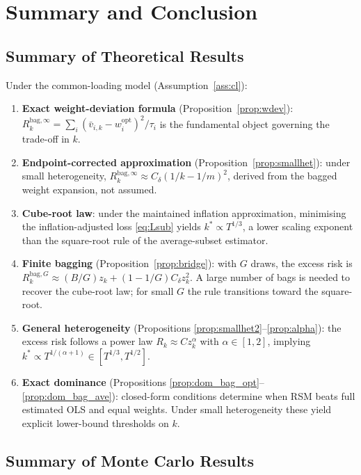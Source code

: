 \documentclass[12pt,a4paper]{article}
\theoremstyle{definition}
\begin{document}
\section{Summary and Conclusion}

\subsection{Summary of Theoretical Results}

Under the common-loading model (Assumption~\ref{ass:cl}):
\begin{enumerate}
\item \textbf{Exact weight-deviation formula} (Proposition~\ref{prop:wdev}):
  $R_k^{\mathrm{bag},\infty}=\sum_i(\bar v_{i,k}-w_i^{\mathrm{opt}})^2/\tau_i$
  is the fundamental object governing the trade-off in $k$.
\item \textbf{Endpoint-corrected approximation} (Proposition~\ref{prop:smallhet}):
  under small heterogeneity, $R_k^{\mathrm{bag},\infty}\approx C_\delta(1/k-1/m)^2$,
  derived from the bagged weight expansion, not assumed.
\item \textbf{Cube-root law}: under the maintained inflation approximation,
  minimising the inflation-adjusted loss \eqref{eq:Lsub} yields
  $k^*\propto T^{1/3}$, a lower scaling exponent than the square-root rule
  of the average-subset estimator.
\item \textbf{Finite bagging} (Proposition~\ref{prop:bridge}): with $G$ draws,
  the excess risk is $R_k^{\mathrm{bag},G}\approx(B/G)z_k+(1-1/G)C_\delta z_k^2$.
  A large number of bags is needed to recover the cube-root law; for small $G$
  the rule transitions toward the square-root.
\item \textbf{General heterogeneity} (Propositions \ref{prop:smallhet2}--\ref{prop:alpha}):
  the excess risk follows a power law $R_k\approx Cz_k^\alpha$ with $\alpha\in[1,2]$,
  implying $k^*\propto T^{1/(\alpha+1)}\in[T^{1/3},T^{1/2}]$.
\item \textbf{Exact dominance} (Propositions \ref{prop:dom_bag_opt}--\ref{prop:dom_bag_ave}):
  closed-form conditions determine when RSM beats full estimated OLS and
  equal weights. Under small heterogeneity these yield explicit
  lower-bound thresholds on $k$.
\end{enumerate}

\subsection{Summary of Monte Carlo Results}
\end{document}
